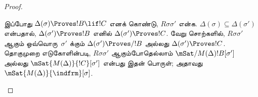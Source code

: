 \documentclass[../../../include/open-logic-section]{subfiles}
\begin{document}
\begin{proof}
\begin{enumerate}
{      இப்போது $\Delta(\sigma) \Proves !B \lif !C$ எனக் கொண்டு,
      $R\sigma\sigma'$ என்க. $\Delta(\sigma) \subseteq
      \Delta(\sigma')$ என்பதால், $\Delta(\sigma') \Proves !B$ எனில்
      $\Delta(\sigma') \Proves !C$. வேறு சொற்களில்,
      $R\sigma\sigma'$ ஆகும் ஒவ்வொரு~$\sigma'$ க்கும்
      $\Delta(\sigma') \Proves/ !B$ அல்லது
      $\Delta(\sigma') \Proves !C$. தொகுமுறை எடுகோளின்படி,
      $R\sigma\sigma'$ ஆகும்போதெல்லாம்
      $\mSat/{M(\Delta)}{!B}[\sigma']$ அல்லது
      $\mSat{M(\Delta)}{!C}[\sigma']$ என்பது இதன் பொருள்; அதாவது
      $\mSat{M(\Delta)}{\indfrm}[\sigma]$.}
  \end{enumerate}
\end{proof}
\end{document}
